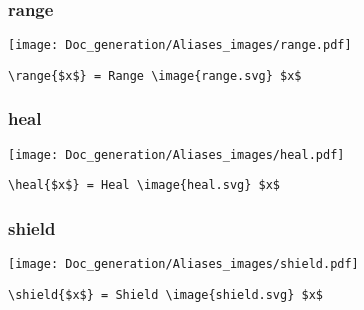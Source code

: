 \documentclass{article}
\begin{document}
\subsubsection{range}
\begin{minipage}{0.45\linewidth}
\raggedright
\begin{spverbatim}
\end{spverbatim}
\end{minipage}
\begin{minipage}{0.45\linewidth}
\raggedleft
\texttt{[image: Doc\_generation/Aliases\_images/range.pdf]}
\end{minipage}
\begin{center}
\begin{BVerbatim}
\range{$x$} = Range \image{range.svg} $x$
\end{BVerbatim}
\end{center}

\subsubsection{heal}
\begin{minipage}{0.45\linewidth}
\raggedright
\begin{spverbatim}
\end{spverbatim}
\end{minipage}
\begin{minipage}{0.45\linewidth}
\raggedleft
\texttt{[image: Doc\_generation/Aliases\_images/heal.pdf]}
\end{minipage}
\begin{center}
\begin{BVerbatim}
\heal{$x$} = Heal \image{heal.svg} $x$
\end{BVerbatim}
\end{center}

\subsubsection{shield}
\begin{minipage}{0.45\linewidth}
\raggedright
\begin{spverbatim}
\end{spverbatim}
\end{minipage}
\begin{minipage}{0.45\linewidth}
\raggedleft
\texttt{[image: Doc\_generation/Aliases\_images/shield.pdf]}
\end{minipage}
\begin{center}
\begin{BVerbatim}
\shield{$x$} = Shield \image{shield.svg} $x$
\end{BVerbatim}
\end{center}
\end{document}
